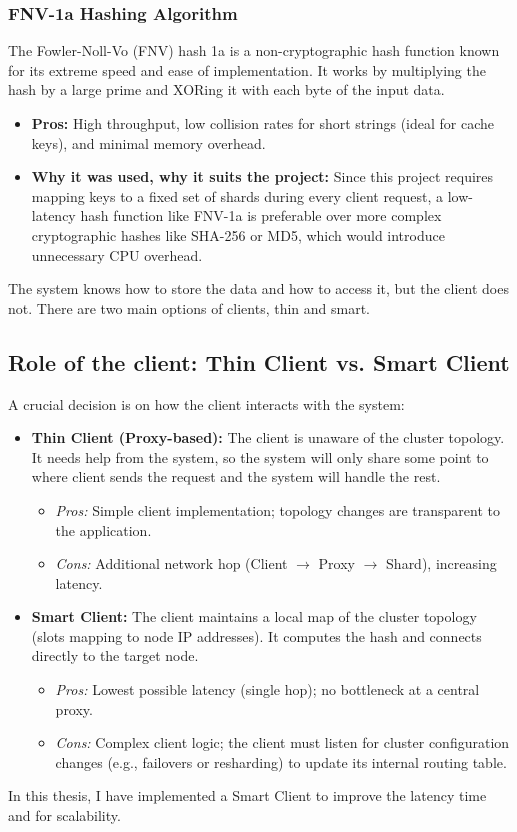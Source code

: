 \documentclass[shortabstract]{iithesis}
\begin{document}
\subsubsection{FNV-1a Hashing Algorithm} \label{subsec:fnv1a}
The Fowler-Noll-Vo (FNV) hash 1a \cite{fnv} is a non-cryptographic hash function known for its extreme speed and ease of implementation. It works by multiplying the hash by a large prime and XORing it with each byte of the input data.
\begin{itemize}
    \item \textbf{Pros:} High throughput, low collision rates for short strings (ideal for cache keys), and minimal memory overhead.
    \item \textbf{Why it was used, why it suits the project:} Since this project requires mapping keys to a fixed set of shards during every client request, a low-latency hash function like FNV-1a is preferable over more complex cryptographic hashes like SHA-256 or MD5, which would introduce unnecessary CPU overhead.
\end{itemize}


The system knows how to store the data and how to access it, but the client does not. There are two main options of clients, thin and smart.

\subsection{Role of the client: Thin Client vs. Smart Client}
A crucial decision is on how the client interacts with the system:
\begin{itemize}
    \item \textbf{Thin Client (Proxy-based):} The client is unaware of the cluster topology. It needs help from the system, so the system will only share some point to where client sends the request and the system will handle the rest. 
    \begin{itemize}
        \item \textit{Pros:} Simple client implementation; topology changes are transparent to the application.
        \item \textit{Cons:} Additional network hop (Client $\rightarrow$ Proxy $\rightarrow$ Shard), increasing latency.
    \end{itemize}
    
    \item \textbf{Smart Client:} The client maintains a local map of the cluster topology (slots mapping to node IP addresses). It computes the hash and connects directly to the target node.
    \begin{itemize}
        \item \textit{Pros:} Lowest possible latency (single hop); no bottleneck at a central proxy.
        \item \textit{Cons:} Complex client logic; the client must listen for cluster configuration changes (e.g., failovers or resharding) to update its internal routing table.
    \end{itemize}
\end{itemize}
In this thesis, I have implemented a Smart Client to improve the latency time and for scalability.
\end{document}
